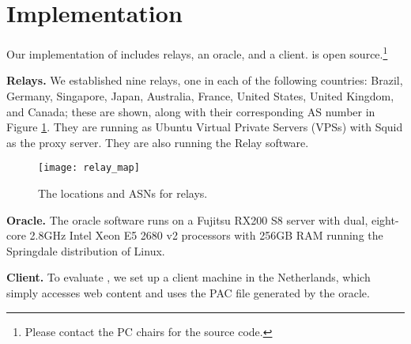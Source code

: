 \section{Implementation}

Our implementation of \system{} includes relays, an oracle, and 
a client. \system{} is open source.\footnote{Please
  contact the PC chairs for the source code.}

\textbf{Relays.}  We established nine relays, one in each of the following countries: Brazil, 
Germany, Singapore, Japan, Australia, France, United States, United Kingdom, and Canada; these 
are shown, along with their corresponding AS number in Figure \ref{fig:relay_locations}.  
They are running as Ubuntu Virtual Private Servers (VPSs) with 
Squid as the proxy server.  They are also running the \system{} Relay software.

\begin{figure}[t!]
\centering
\texttt{[image: relay\_map]}
\caption{The locations and ASNs for \system{} relays.}
\label{fig:relay_locations}
\end{figure}

\textbf{Oracle.}  The oracle software runs on a Fujitsu RX200 S8 server with dual, 
eight-core 2.8GHz Intel Xeon E5 2680 v2 processors with 256GB RAM running the 
Springdale distribution of Linux. 

\textbf{Client.} To evaluate \system{}, we set up a client 
machine in the Netherlands, which simply accesses web content and uses the PAC 
file generated by the oracle. 
